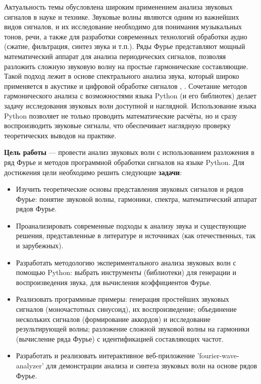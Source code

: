 \documentclass[bachelor, och, diploma]{SCWorks}
\begin{document}
\intro

Актуальность темы обусловлена широким применением анализа звуковых сигналов в науке и технике. Звуковые волны являются одним из важнейших видов сигналов, и их исследование необходимо для понимания музыкальных тонов, речи, а также для разработки современных технологий обработки аудио (сжатие, фильтрация, синтез звука и т.п.). Ряды Фурье представляют мощный математический аппарат для анализа периодических сигналов, позволяя разложить сложную звуковую волну на простые гармонические составляющие. Такой подход лежит в основе спектрального анализа звука, который широко применяется в акустике и цифровой обработке сигналов \cite{fletcher}, \cite{rossing}. Сочетание методов гармонического анализа с возможностями языка Python (и его библиотек) делает задачу исследования звуковых волн доступной и наглядной. Использование языка Python позволяет не только проводить математические расчёты, но и сразу воспроизводить звуковые сигналы, что обеспечивает наглядную проверку теоретических выводов на практике.

\textbf{Цель работы} --- провести анализ звуковых волн с использованием разложения в ряд Фурье и методов программной обработки сигналов на языке Python. Для достижения цели необходимо решить следующие \textbf{задачи}:
\begin{itemize}
    \item Изучить теоретические основы представления звуковых сигналов и рядов Фурье: понятие звуковой волны, гармоники, спектра, математический аппарат рядов Фурье.
    \item Проанализировать современные подходы к анализу звука и существующие решения, представленные в литературе и источниках (как отечественных, так и зарубежных).
    \item Разработать методологию экспериментального анализа звуковых волн с помощью Python: выбрать инструменты (библиотеки) для генерации и воспроизведения звука, для вычисления коэффициентов Фурье.
    \item Реализовать программные примеры: генерация простейших звуковых сигналов (моночастотных синусоид), их воспроизведение; объединение нескольких сигналов (формирование аккордов) и исследование результирующей волны; разложение сложной звуковой волны на гармоники (вычисление ряда Фурье) с идентификацией составляющих частот.
    \item Разработать и реализовать интерактивное веб-приложение 'fourier-wave-analyzer' для демонстрации анализа и синтеза звуковых волн на основе рядов Фурье.
\end{itemize}
\end{document}
